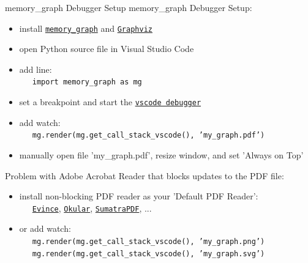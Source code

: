 \documentclass[10pt, colorlinks=true, urlcolor=blue]{beamer}
\begin{document}
\begin{frame}{memory\_graph Debugger Setup}
  \vspace{-1em}
  memory\_graph Debugger Setup:
  \begin{itemize}
  \item install \href{https://pypi.org/project/memory-graph/}{\texttt{memory\_graph}} and \href{https://graphviz.org/download/}{\texttt{Graphviz}}
  \item open Python source file in Visual Studio Code
  \item add line: \\ \ \ \ {\footnotesize \texttt{import memory_graph as mg}}
  \item set a breakpoint and start the \href{https://code.visualstudio.com/docs/python/debugging}{\texttt{vscode debugger}}
  \item add watch: \\ \ \ \ {\footnotesize \texttt{mg.render(mg.get_call_stack_vscode(), 'my_graph.pdf')}}
  \item manually open file 'my\_graph.pdf', resize window,  and set 'Always on Top'
  \end{itemize}
  
  \vspace{1.5em}
  
  Problem with Adobe Acrobat Reader that blocks updates to the PDF file:
  \begin{itemize}
  \item install non-blocking PDF reader as your 'Default PDF Reader': \\ \ \ \
    \href{https://www.fosshub.com/Evince.html}{\texttt{Evince}},
    \href{https://okular.kde.org/}{\texttt{Okular}},
    \href{https://www.sumatrapdfreader.org/}{\texttt{SumatraPDF}}, ...
  \item or add watch: \\
\ \ \ {\footnotesize \texttt{mg.render(mg.get_call_stack_vscode(), 'my_graph.png')}} \\
\ \ \ {\footnotesize \texttt{mg.render(mg.get_call_stack_vscode(), 'my_graph.svg')}}
  \end{itemize}
\end{frame}
\end{document}
